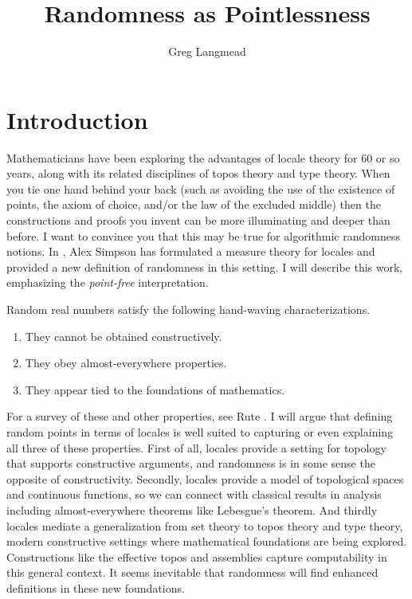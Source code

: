 \documentclass[14pt]{extarticle}
\title{Randomness as Pointlessness}
\author{Greg Langmead}
\begin{document}
\maketitle
\section{Introduction}
Mathematicians have been exploring the advantages of locale theory for 60 or so years, along with its related disciplines of topos theory and type theory. When you tie one hand behind your back (such as avoiding the use of the existence of points, the axiom of choice, and/or the law of the excluded middle) then the constructions and proofs you invent can be more illuminating and deeper than before. I want to convince you that this may be true for algorithmic randomness notions. In \cite{simpson}, Alex Simpson has formulated a measure theory for locales and provided a new definition of randomness in this setting. I will describe this work, emphasizing the \emph{point-free} interpretation.

Random real numbers satisfy the following hand-waving characterizations.
\begin{enumerate}
\item They cannot be obtained constructively.
\item They obey almost-everywhere properties.
\item They appear tied to the foundations of mathematics.
\end{enumerate}
For a survey of these and other properties, see Rute \cite{rute}. I will argue that defining random points in terms of locales is well suited to capturing or even explaining all three of these properties. First of all, locales provide a setting for topology that supports constructive arguments, and randomness is in some sense the opposite of constructivity. Secondly, locales provide a model of topological spaces and continuous functions, so we can connect with classical results in analysis including almost-everywhere theorems like Lebesgue's theorem. And thirdly locales mediate a generalization from set theory to topos theory and type theory, modern constructive settings where mathematical foundations are being explored. Constructions like the effective topos and assemblies capture computability in this general context. It seems inevitable that randomness will find enhanced definitions in these new foundations.
\end{document}
